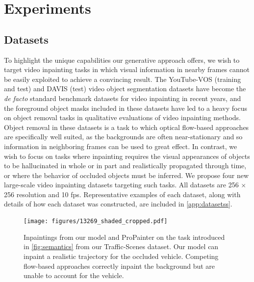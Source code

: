 \chapter{Experiments}
\section{Datasets}
To highlight the unique capabilities our generative approach offers, we wish to target video inpainting tasks in which visual information in nearby frames cannot be easily exploited to achieve a convincing result. The YouTube-VOS \cite{youtubevos1} (training and test) and DAVIS \cite{davis} (test) video object segmentation datasets have become the \emph{de facto} standard benchmark datasets for video inpainting in recent years, and the foreground object masks included in these datasets have led to a heavy focus on object removal tasks in qualitative evaluations of video inpainting methods. Object removal in these datasets is a task to which \eg optical flow-based approaches are specifically well suited, as the backgrounds are often near-stationary and so information in neighboring frames can be used to great effect. In contrast, we wish to focus on tasks where inpainting requires the visual appearances of objects to be hallucinated in whole or in part and realistically propagated through time, or where the behavior of occluded objects must be inferred. We propose four new large-scale video inpainting datasets targeting such tasks. All datasets are 256 $\times$ 256 resolution and 10 fps. Representative examples of each dataset, along with details of how each dataset was constructed, are included in \cref{app:datasetss}.
\begin{figure}[t]
\centering
\texttt{[image: figures/13269\_shaded\_cropped.pdf]}
\caption{Inpaintings from our model and ProPainter on the task introduced in \cref{fig:semantics} from our Traffic-Scenes dataset. Our model can inpaint a realistic trajectory for the occluded vehicle. Competing flow-based approaches correctly inpaint the background but are unable to account for the vehicle.}
\label{fig:traffic-scenes}
\end{figure}
